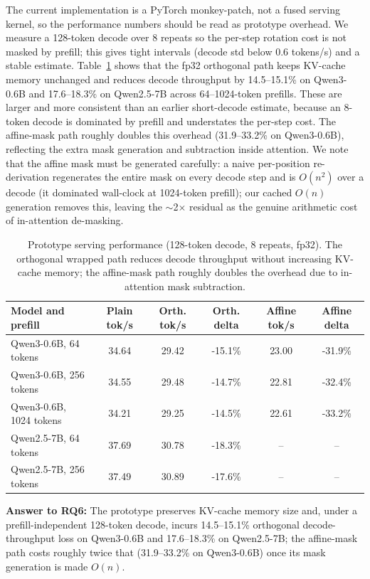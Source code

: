 The current implementation is a PyTorch monkey-patch, not a fused serving kernel, so the performance numbers should be read as prototype overhead. We measure a 128-token decode over 8 repeats so the per-step rotation cost is not masked by prefill; this gives tight intervals (decode std below $0.6$ tokens/s) and a stable estimate. Table~\ref{tab:performance} shows that the fp32 orthogonal path keeps KV-cache memory unchanged and reduces decode throughput by 14.5--15.1\% on Qwen3-0.6B and 17.6--18.3\% on Qwen2.5-7B across 64--1024-token prefills. These are larger and more consistent than an earlier short-decode estimate, because an 8-token decode is dominated by prefill and understates the per-step cost. The affine-mask path roughly doubles this overhead (31.9--33.2\% on Qwen3-0.6B), reflecting the extra mask generation and subtraction inside attention. We note that the affine mask must be generated carefully: a naive per-position re-derivation regenerates the entire mask on every decode step and is $O(n^2)$ over a decode (it dominated wall-clock at 1024-token prefill); our cached $O(n)$ generation removes this, leaving the $\sim$2$\times$ residual as the genuine arithmetic cost of in-attention de-masking.

\begin{table}[t]
\centering
\caption{Prototype serving performance (128-token decode, 8 repeats, fp32). The orthogonal wrapped path reduces decode throughput without increasing KV-cache memory; the affine-mask path roughly doubles the overhead due to in-attention mask subtraction.}
\label{tab:performance}
\begin{tabular}{lccccc}
\toprule
Model and prefill & Plain tok/s & Orth. tok/s & Orth. delta & Affine tok/s & Affine delta \\
\midrule
Qwen3-0.6B, 64 tokens & 34.64 & 29.42 & -15.1\% & 23.00 & -31.9\% \\
Qwen3-0.6B, 256 tokens & 34.55 & 29.48 & -14.7\% & 22.81 & -32.4\% \\
Qwen3-0.6B, 1024 tokens & 34.21 & 29.25 & -14.5\% & 22.61 & -33.2\% \\
Qwen2.5-7B, 64 tokens & 37.69 & 30.78 & -18.3\% & -- & -- \\
Qwen2.5-7B, 256 tokens & 37.49 & 30.89 & -17.6\% & -- & -- \\
\bottomrule
\end{tabular}
\end{table}

\textbf{Answer to RQ6:} The prototype preserves KV-cache memory size and, under a prefill-independent 128-token decode, incurs 14.5--15.1\% orthogonal decode-throughput loss on Qwen3-0.6B and 17.6--18.3\% on Qwen2.5-7B; the affine-mask path costs roughly twice that (31.9--33.2\% on Qwen3-0.6B) once its mask generation is made $O(n)$.

